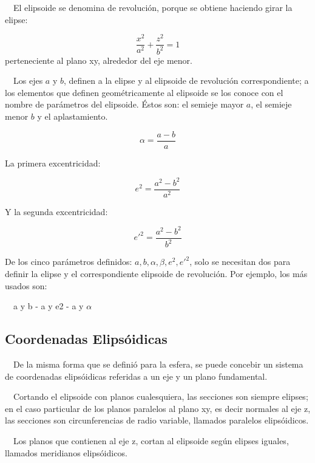 \documentclass{tufte-book}
\begin{document}
\ \ El elipsoide se denomina de revolución, porque se obtiene haciendo
girar la elipse:

\begin{equation*}
{\frac{x^{{2}}}{a^{{2}}}+\frac{z^{{2}}}{b^{{2}}}=1}
\end{equation*}
perteneciente al plano xy, alrededor del eje menor. 

\ \ Los ejes \(a\) y \(b\), definen a la elipse y al
elipsoide de revolución correspondiente; a los elementos que definen
geométricamente al elipsoide se los conoce con el nombre de
parámetros del elipsoide. Éstos son: el semieje mayor
\(a\), el semieje menor \(b\) y el aplastamiento.

\begin{equation*}
{\alpha =\frac{a-b}{a}}
\end{equation*}

La primera excentricidad:

\begin{equation*}
e^2=\frac{a^2-b^2}{a^2}
\end{equation*}

Y la segunda excentricidad:

\begin{equation*}
e'^2=\frac{a^2-b^2}{b^2}
\end{equation*}

De los cinco parámetros definidos:  \( a,b,\alpha ,\beta ,e^2,e'^2\),
solo se necesitan dos para definir la elipse y el correspondiente
elipsoide de revolución. Por ejemplo, los más usados son:

\ \ a y b  {}-  a y e2  {}-  a y ${\alpha }$

\subsection{Coordenadas Elipsóidicas}

\ \ De la misma forma que se definió para la esfera, se puede concebir
un sistema de coordenadas elipsóidicas referidas a un eje y un plano
fundamental.

\ \ Cortando el elipsoide con planos cualesquiera, las secciones son
siempre elipses; en el caso particular de los planos paralelos al plano
xy, es decir normales al eje z, las secciones son circunferencias de
radio variable, llamados paralelos elipsóidicos. 

\ \ Los planos que contienen al eje z, cortan al elipsoide según
elipses iguales, llamados meridianos elipsóidicos. 
\end{document}

